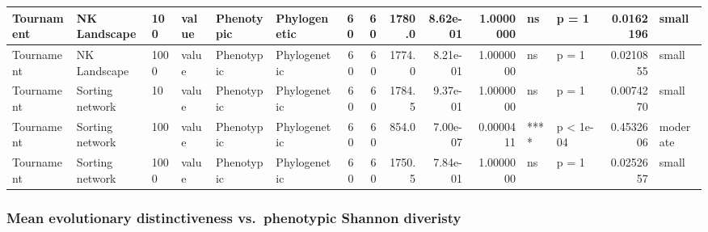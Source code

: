 \documentclass[]{book}
\begin{document}
\begin{table}
\begin{tabular}[t]{l|l|l|l|l|l|r|r|r|r|r|l|l|r|l}
\hline
Tournament & NK Landscape & 100 & value & Phenotypic & Phylogenetic & 60 & 60 & 1780.0 & 8.62e-01 & 1.0000000 & ns & p = 1 & 0.0162196 & small\\
\hline
Tournament & NK Landscape & 1000 & value & Phenotypic & Phylogenetic & 60 & 60 & 1774.0 & 8.21e-01 & 1.0000000 & ns & p = 1 & 0.0210855 & small\\
\hline
Tournament & Sorting network & 10 & value & Phenotypic & Phylogenetic & 60 & 60 & 1784.5 & 9.37e-01 & 1.0000000 & ns & p = 1 & 0.0074270 & small\\
\hline
Tournament & Sorting network & 100 & value & Phenotypic & Phylogenetic & 60 & 60 & 854.0 & 7.00e-07 & 0.0000411 & **** & p < 1e-04 & 0.4532606 & moderate\\
\hline
Tournament & Sorting network & 1000 & value & Phenotypic & Phylogenetic & 60 & 60 & 1750.5 & 7.84e-01 & 1.0000000 & ns & p = 1 & 0.0252657 & small\\
\hline
\end{tabular}
\end{table}

\hypertarget{mean-evolutionary-distinctiveness-vs.phenotypic-shannon-diveristy}{%
\subsubsection{Mean evolutionary distinctiveness vs.~phenotypic Shannon diveristy}\label{mean-evolutionary-distinctiveness-vs.phenotypic-shannon-diveristy}}
\end{document}

